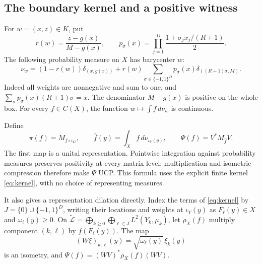 \documentclass[11pt,letterpaper]{amsart}
\theoremstyle{definition}
\theoremstyle{remark}
\numberwithin{equation}{section}
\begin{document}
\subsection{The boundary kernel and a positive witness}

For \(w=(x,z)\in K\), put
\[
 r(w)=\frac{z-g(x)}{M-g(x)},\qquad
 p_\sigma(x)=\prod_{j=1}^D\frac{1+\sigma_jx_j/(R+1)}2.
\]
The following probability measure on \(X\) has barycenter \(w\):
\begin{equation}\label{eq:kernel}
 \nu_w=(1-r(w))\delta_{(x,g(x))}
       +r(w)\sum_{\sigma\in\{-1,1\}^D}
                p_\sigma(x)\delta_{((R+1)\sigma,M)}.
\end{equation}
Indeed all weights are nonnegative and sum to one, and
\(\sum_\sigma p_\sigma(x)(R+1)\sigma=x\).
The denominator \(M-g(x)\) is positive on the whole box.
For every \(f\in C(X)\), the function
\(w\mapsto\int f\,d\nu_w\) is continuous.

Define
\begin{equation}\label{eq:maps}
 \pi(f)=M_{f\circ\iota_G},\qquad
 \widehat f(y)=\int_X f\,d\nu_{\iota_Y(y)},\qquad
 \Psi(f)=V^*M_{\widehat f}V.
\end{equation}
The first map is a unital representation. Pointwise integration
against probability measures preserves positivity at every matrix
level; multiplication and isometric compression therefore make
\(\Psi\) UCP. This formula uses the explicit finite kernel
\eqref{eq:kernel}, with no choice of representing measures.

It also gives a representation dilation directly. Index the terms
of \eqref{eq:kernel} by \(J=\{0\}\cup\{-1,1\}^D\), writing
their locations and weights at \(\iota_Y(y)\) as
\(F_\ell(y)\in X\) and \(\omega_\ell(y)\ge0\).
On
\(\widetilde{\mathcal L}
 =\bigoplus_{k\ge0}\bigoplus_{\ell\in J}L^2(Y_k,\mu_k)\),
let \(\rho_X(f)\) multiply component \((k,\ell)\) by
\(f(F_\ell(y))\). The map
\[
              (W\xi)_{k,\ell}(y)
                    =\sqrt{\omega_\ell(y)}\,\xi_k(y)
\]
is an isometry, and
\(\Psi(f)=(WV)^*\rho_X(f)(WV)\).
\end{document}

